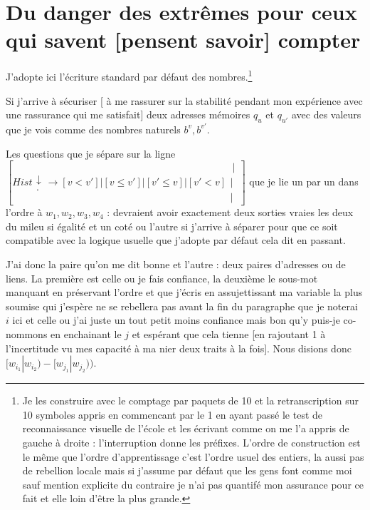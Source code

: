 \documentclass{article}
\begin{document}
  
\section{Du danger des extrêmes pour ceux qui savent [pensent savoir] compter}
J'adopte ici l'écriture standard par défaut des nombres.\footnote{ Je  les construire avec le comptage par paquets de 10 et la retranscription sur 10 symboles appris en commencant par le 1 en ayant passé le test de reconnaissance visuelle de l'école et les écrivant comme on me l'a appris de gauche à droite : l'interruption donne les préfixes. L'ordre de construction est le même que l'ordre d'apprentissage c'est l'ordre usuel des entiers, la aussi pas de rebellion locale mais si j'assume par défaut que les gens font comme moi sauf mention explicite du contraire je n'ai pas quantifé mon assurance pour ce fait et elle loin d'être la plus grande.}

Si j'arrive à sécuriser [ à me rassurer sur la stabilité pendant mon expérience avec une rassurance qui me satisfait] deux adresses mémoires $q_u$ et $q_{u'}$
avec des valeurs que je vois comme des nombres naturels $b^{v},b^{v'}$.

Les questions que je sépare sur la ligne 
$[Hist \begin{matrix} \downarrow \\ . \end{matrix} \rightarrow [v<v'] |[ v\le v'] |[ v'\le v] |[ v'<v] \begin{matrix} \ | \\ | \\|  \end{matrix} ]$  que je lie un par un dans l'ordre à  $w_1,w_2,w_3,w_4$ : 
devraient avoir exactement deux sorties vraies  les deux du mileu si égalité et un coté ou l'autre si j'arrive à séparer pour que ce soit compatible avec la logique usuelle que j'adopte par défaut cela dit en passant.
 
J'ai donc la paire qu'on me dit bonne et l'autre : deux paires d'adresses ou de liens. La première est  celle ou je fais confiance, la deuxième le sous-mot manquant en préservant l'ordre et que j'écris en assujettissant ma variable la plus soumise qui j'espère ne se rebellera pas avant la fin du paragraphe
que je noterai $i$ ici et celle ou j'ai juste un tout petit moins confiance mais bon qu'y puis-je co-nommons en enchainant le $j$  et espérant que cela tienne 
[en rajoutant 1 à l'incertitude vu mes capacité à ma nier deux traits à la fois]. Nous disions donc $[w_{i_1}|w_{i_2})-[w_{j_1}|w_{j_2}))$.
\end{document}
